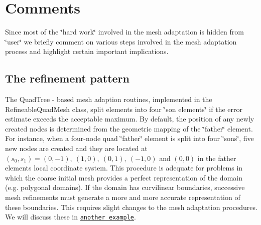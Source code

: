 \hypertarget{index_exercises}{}\section{Comments}\label{index_exercises}
Since most of the \char`\"{}hard work\char`\"{} involved in the mesh adaptation is hidden from \char`\"{}user\char`\"{} we briefly comment on various steps involved in the mesh adaptation process and highlight certain important implications.\hypertarget{index_splitting}{}\subsection{The refinement pattern}\label{index_splitting}
The {\ttfamily Quad\+Tree} -\/ based mesh adaption routines, implemented in the {\ttfamily Refineable\+Quad\+Mesh} class, split elements into four \char`\"{}son elements\char`\"{} if the error estimate exceeds the acceptable maximum. By default, the position of any newly created nodes is determined from the geometric mapping of the \char`\"{}father\char`\"{} element. For instance, when a four-\/node quad \char`\"{}father\char`\"{} element is split into four \char`\"{}sons\char`\"{}, five new nodes are created and they are located at $ (s_0,s_1) = (0,-1), \ (1,0), \ (0,1), \ (-1,0) $ and $ (0,0)$ in the father element\textquotesingle{}s local coordinate system. This procedure is adequate for problems in which the coarse initial mesh provides a perfect representation of the domain (e.\+g. polygonal domains). If the domain has curvilinear boundaries, successive mesh refinements must generate a more and more accurate representation of these boundaries. This requires slight changes to the mesh adaptation procedures. We will discuss these in \href{../../../poisson/fish_poisson2/html/index.html}{\tt another example}.

